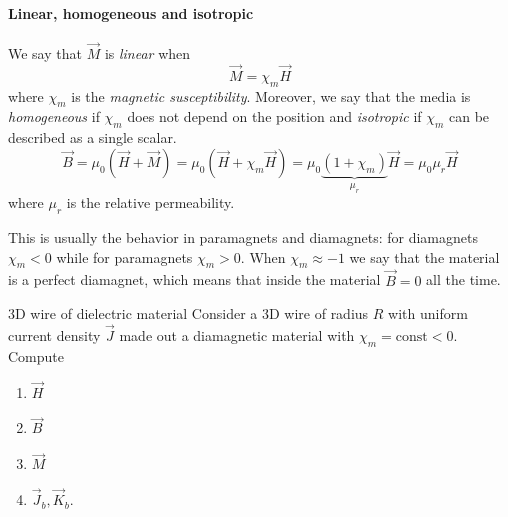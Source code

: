 \documentclass[12pt]{extarticle}
\begin{document}
\paragraph{Linear, homogeneous and isotropic}
We say that $\vec M$ is \emph{linear} when
\begin{equation}
	\vec M = \chi_m \vec H
\end{equation}
where $\chi_m$ is the \emph{magnetic susceptibility}.
Moreover, we say that the media is \emph{homogeneous} if $\chi_m$ does not depend on the position
and \emph{isotropic} if $\chi_m$ can be described as a single scalar.
\begin{equation}
	\vec B = \mu_0(\vec H + \vec M) = \mu_0 (\vec H + \chi_m \vec H) = \mu_0 \underbrace{(1+\chi_m)}_{\mu_r} \vec H = \mu_0 \mu_r \vec H
\end{equation}
where $\mu_r$ is the relative permeability.

This is usually the behavior in paramagnets and diamagnets: for diamagnets $\chi_m < 0$ while for paramagnets $\chi_m > 0$.
When $\chi_m \approx -1$ we say that the material is a perfect diamagnet, which means that inside the material $\vec B = 0$ all the time.

\begin{example}{3D wire of dielectric material}{}
	Consider a 3D wire of radius $R$ with uniform current density $\vec J$ made out a diamagnetic material with $\chi_m = \text{const} < 0$.
	Compute
	\begin{enumerate}
		\item $\vec H$
		\item $\vec B$
		\item $\vec M$
		\item $\vec J_b, \vec K_b$.
	\end{enumerate}
\end{example}
\end{document}
